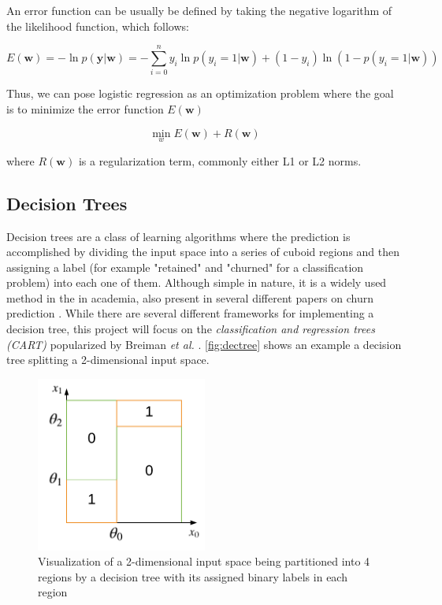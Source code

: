 \documentclass{kththesis}
\begin{document}
An error function can be usually be defined by taking the negative logarithm of the likelihood function, which follows:

\begin{equation}
E(\mathbf{w}) = -\ln p(\mathbf{y}|\mathbf{w}) = - \sum_{i=0}^{n} y_i \ln p(y_i=1|\mathbf{w}) + (1-y_i) \ln (1 - p(y_i=1|\mathbf{w}))
\end{equation}

Thus, we can pose logistic regression as an optimization problem where the goal is to minimize the error function $E(\mathbf{w})$ 

\begin{equation}
\displaystyle{\min_w} E(\mathbf{w}) + R(\mathbf{w})
\end{equation}

where $R(\mathbf{w})$ is a regularization term, commonly either L1 or L2 norms.

\subsection{Decision Trees}
Decision trees are a class of learning algorithms where the prediction is accomplished by dividing the input space into a series of cuboid regions and then assigning a label (for example "retained" and "churned" for a classification problem) into each one of them. Although simple in nature, it is a widely used method in the in academia, also present in several different papers on churn prediction \citep{Pudipeddi2014}\citep{Hassouna2015} \citep{Ballings2012} \citep{Khan2015}. While there are several different frameworks for implementing a decision tree, this project will focus on the \emph{classification and regression trees (CART)} popularized by Breiman \emph{et al.} \citep{breiman1984classification}. \autoref{fig:dectree} shows an example a decision tree splitting a 2-dimensional input space.  

\begin{figure}[h]
    \centering
    \includegraphics[width=0.5\textwidth,keepaspectratio]{figures/dectree.pdf}
    \caption{Visualization of a 2-dimensional input space being partitioned into 4 regions by a decision tree with its assigned binary labels in each region}
    \label{fig:dectree}
\end{figure}
\end{document}

